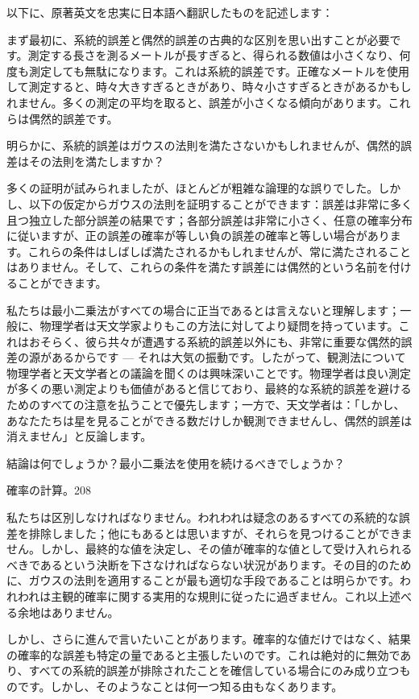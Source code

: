 \documentclass[a4paper,11pt,openany]{ltjsbook}
\begin{document}
以下に、原著英文を忠実に日本語へ翻訳したものを記述します：

まず最初に、系統的誤差と偶然的誤差の古典的な区別を思い出すことが必要です。測定する長さを測るメートルが長すぎると、得られる数値は小さくなり、何度も測定しても無駄になります。これは系統的誤差です。正確なメートルを使用して測定すると、時々大きすぎるときがあり、時々小さすぎるときがあるかもしれません。多くの測定の平均を取ると、誤差が小さくなる傾向があります。これらは偶然的誤差です。

明らかに、系統的誤差はガウスの法則を満たさないかもしれませんが、偶然的誤差はその法則を満たしますか？


多くの証明が試みられましたが、ほとんどが粗雑な論理的な誤りでした。しかし、以下の仮定からガウスの法則を証明することができます：誤差は非常に多く且つ独立した部分誤差の結果です；各部分誤差は非常に小さく、任意の確率分布に従いますが、正の誤差の確率が等しい負の誤差の確率と等しい場合があります。これらの条件はしばしば満たされるかもしれませんが、常に満たされることはありません。そして、これらの条件を満たす誤差には偶然的という名前を付けることができます。

私たちは最小二乗法がすべての場合に正当であるとは言えないと理解します；一般に、物理学者は天文学家よりもこの方法に対してより疑問を持っています。これはおそらく、彼ら共々が遭遇する系統的誤差以外にも、非常に重要な偶然的誤差の源があるからです — それは大気の振動です。したがって、観測法について物理学者と天文学者との議論を聞くのは興味深いことです。物理学者は良い測定が多くの悪い測定よりも価値があると信じており、最終的な系統的誤差を避けるためのすべての注意を払うことで優先します；一方で、天文学者は：「しかし、あなたたちは星を見ることができる数だけしか観測できませんし、偶然的誤差は消えません」と反論します。

結論は何でしょうか？最小二乗法を使用を続けるべきでしょうか？

確率の計算。208

私たちは区別しなければなりません。われわれは疑念のあるすべての系統的な誤差を排除しました；他にもあるとは思いますが、それらを見つけることができません。しかし、最終的な値を決定し、その値が確率的な値として受け入れられるべきであるという決断を下さなければならない状況があります。その目的のために、ガウスの法則を適用することが最も適切な手段であることは明らかです。われわれは主観的確率に関する実用的な規則に従ったに過ぎません。これ以上述べる余地はありません。

しかし、さらに進んで言いたいことがあります。確率的な値だけではなく、結果の確率的な誤差も特定の量であると主張したいのです。これは絶対的に無効であり、すべての系統的誤差が排除されたことを確信している場合にのみ成り立つものです。しかし、そのようなことは何一つ知る由もなくあります。
\end{document}
